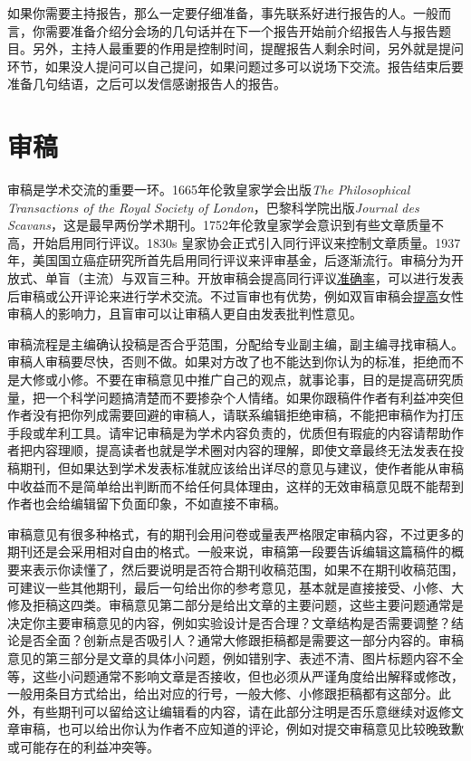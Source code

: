 \documentclass[]{tufte-book}
\begin{document}
如果你需要主持报告，那么一定要仔细准备，事先联系好进行报告的人。一般而言，你需要准备介绍分会场的几句话并在下一个报告开始前介绍报告人与报告题目。另外，主持人最重要的作用是控制时间，提醒报告人剩余时间，另外就是提问环节，如果没人提问可以自己提问，如果问题过多可以说场下交流。报告结束后要准备几句结语，之后可以发信感谢报告人的报告。

\hypertarget{ux5ba1ux7a3f}{%
\section{审稿}\label{ux5ba1ux7a3f}}

审稿是学术交流的重要一环。1665年伦敦皇家学会出版\emph{The Philosophical Transactions of the Royal Society of London}，巴黎科学院出版\emph{Journal des Scavans}，这是最早两份学术期刊。1752年伦敦皇家学会意识到有些文章质量不高，开始启用同行评议。1830s 皇家协会正式引入同行评议来控制文章质量。1937年，美国国立癌症研究所首先启用同行评议来评审基金，后逐渐流行。审稿分为开放式、单盲（主流）与双盲三种。开放审稿会提高同行评议\href{https://doi.org/10.1371/journal.pone.0026895}{准确率}，可以进行发表后审稿或公开评论来进行学术交流。不过盲审也有优势，例如双盲审稿会\href{https://www.sciencedirect.com/science/article/pii/S0169534707002704}{提高}女性审稿人的影响力，且盲审可以让审稿人更自由发表批判性意见。

审稿流程是主编确认投稿是否合乎范围，分配给专业副主编，副主编寻找审稿人。审稿人审稿要尽快，否则不做。如果对方改了也不能达到你认为的标准，拒绝而不是大修或小修。不要在审稿意见中推广自己的观点，就事论事，目的是提高研究质量，把一个科学问题搞清楚而不要掺杂个人情绪。如果你跟稿件作者有利益冲突但作者没有把你列成需要回避的审稿人，请联系编辑拒绝审稿，不能把审稿作为打压手段或牟利工具。请牢记审稿是为学术内容负责的，优质但有瑕疵的内容请帮助作者把内容理顺，提高读者也就是学术圈对内容的理解，即使文章最终无法发表在投稿期刊，但如果达到学术发表标准就应该给出详尽的意见与建议，使作者能从审稿中收益而不是简单给出判断而不给任何具体理由，这样的无效审稿意见既不能帮到作者也会给编辑留下负面印象，不如直接不审稿。

审稿意见有很多种格式，有的期刊会用问卷或量表严格限定审稿内容，不过更多的期刊还是会采用相对自由的格式。一般来说，审稿第一段要告诉编辑这篇稿件的概要来表示你读懂了，然后要说明是否符合期刊收稿范围，如果不在期刊收稿范围，可建议一些其他期刊，最后一句给出你的参考意见，基本就是直接接受、小修、大修及拒稿这四类。审稿意见第二部分是给出文章的主要问题，这些主要问题通常是决定你主要审稿意见的内容，例如实验设计是否合理？文章结构是否需要调整？结论是否全面？创新点是否吸引人？通常大修跟拒稿都是需要这一部分内容的。审稿意见的第三部分是文章的具体小问题，例如错别字、表述不清、图片标题内容不全等，这些小问题通常不影响文章是否接收，但也必须从严谨角度给出解释或修改，一般用条目方式给出，给出对应的行号，一般大修、小修跟拒稿都有这部分。此外，有些期刊可以留给这让编辑看的内容，请在此部分注明是否乐意继续对返修文章审稿，也可以给出你认为作者不应知道的评论，例如对提交审稿意见比较晚致歉或可能存在的利益冲突等。
\end{document}
